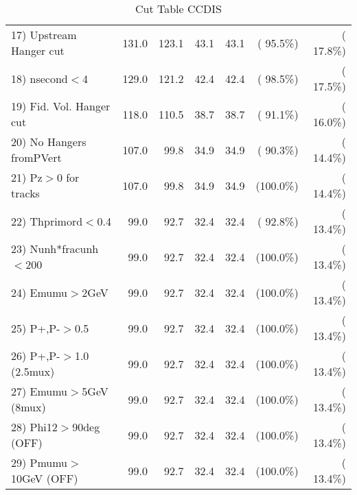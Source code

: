 \begin{table}[h!]
\begin{tabular}{||l||r|r|r|r|r|r||}
 17) Upstream Hanger cut  &        131.0 &        123.1 &         43.1 &         43.1 & ( 95.5\%) & ( 17.8\%) \\
 18) nsecond$<$4          &        129.0 &        121.2 &         42.4 &         42.4 & ( 98.5\%) & ( 17.5\%) \\
 19) Fid. Vol. Hanger cut &        118.0 &        110.5 &         38.7 &         38.7 & ( 91.1\%) & ( 16.0\%) \\
 20) No Hangers fromPVert &        107.0 &         99.8 &         34.9 &         34.9 & ( 90.3\%) & ( 14.4\%) \\
 21) Pz$>$0 for tracks    &        107.0 &         99.8 &         34.9 &         34.9 & (100.0\%) & ( 14.4\%) \\
 22) Thprimord$<$0.4      &         99.0 &         92.7 &         32.4 &         32.4 & ( 92.8\%) & ( 13.4\%) \\
 23) Nunh*fracunh$<$200   &         99.0 &         92.7 &         32.4 &         32.4 & (100.0\%) & ( 13.4\%) \\
 24) Emumu$>$2GeV         &         99.0 &         92.7 &         32.4 &         32.4 & (100.0\%) & ( 13.4\%) \\
 25) P+,P-$>$0.5          &         99.0 &         92.7 &         32.4 &         32.4 & (100.0\%) & ( 13.4\%) \\
 26) P+,P-$>$1.0 (2.5mux) &         99.0 &         92.7 &         32.4 &         32.4 & (100.0\%) & ( 13.4\%) \\
 27) Emumu$>$5GeV  (8mux) &         99.0 &         92.7 &         32.4 &         32.4 & (100.0\%) & ( 13.4\%) \\
 28) Phi12$>$90deg  (OFF) &         99.0 &         92.7 &         32.4 &         32.4 & (100.0\%) & ( 13.4\%) \\
 29) Pmumu$>$10GeV  (OFF) &         99.0 &         92.7 &         32.4 &         32.4 & (100.0\%) & ( 13.4\%) \\
 \hline
 \hline
 \end{tabular}
 \caption{Cut Table  CCDIS    }
 \label{tab-cutcohjpsi-mumu_ccdis}
 \end{table}
